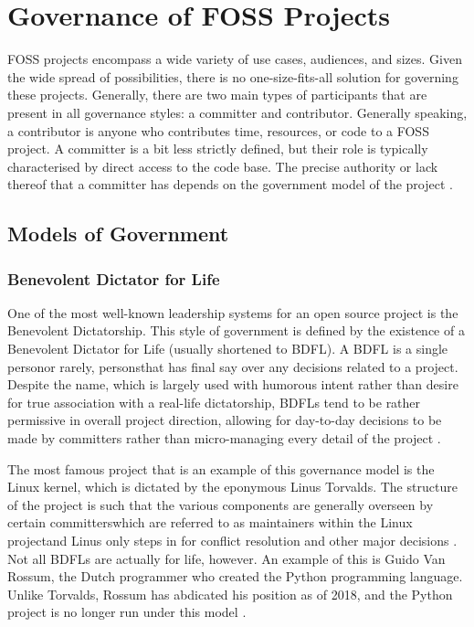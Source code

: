 \documentclass[manuscript,screen,nonacm,12pt]{acmart}
\begin{document}
\section{Governance of FOSS Projects}
\label{sec:gov}
FOSS projects encompass a wide variety of use cases, audiences, and sizes. Given
the wide spread of possibilities, there is no one-size-fits-all solution for
governing these projects. Generally, there are two main types of participants
that are present in all governance styles: a committer and contributor.
Generally speaking, a contributor is anyone who contributes time, resources, or
code to a FOSS project. A committer is a bit less strictly defined, but their
role is typically characterised by direct access to the code base. The precise
authority or lack thereof that a committer has depends on the government model
of the project \cite{Ritvo2017}.

\subsection{Models of Government}
\subsubsection{Benevolent Dictator for Life}
One of the most well-known leadership systems for an open source project is the
Benevolent Dictatorship. This style of government is defined by the existence of
a Benevolent Dictator for Life (usually shortened to BDFL). A BDFL is a single
person\textemdash or rarely, persons\textemdash that has final say over any
decisions related to a project. Despite the name, which is largely used with
humorous intent rather than desire for true association with a real-life
dictatorship, BDFLs tend to be rather permissive in overall project direction,
allowing for day-to-day decisions to be made by committers rather than
micro-managing every detail of the project \cite{Ritvo2017}.

The most famous project that is an example of this governance model is the Linux
kernel, which is dictated by the eponymous Linus Torvalds. The structure of the
project is such that the various components are generally overseen by certain
committers\textemdash which are referred to as maintainers within the Linux
project\textemdash and Linus only steps in for conflict resolution and other
major decisions \cite{Ritvo2017}. Not all BDFLs are actually for life, however.
An example of this is Guido Van Rossum, the Dutch programmer who created the
Python programming language. Unlike Torvalds, Rossum has abdicated his position
as of 2018, and the Python project is no longer run under this model
\cite{fairchild_2018}.
\end{document}
